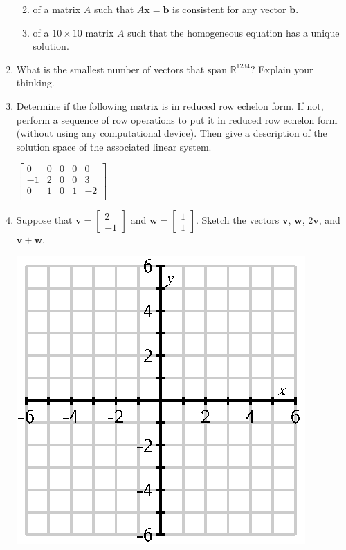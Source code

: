 \documentclass[12pt]{article}
\newcommand{\ds}{\displaystyle}
\newcommand{\vs}[1]{\vspace{#1in}}
\newcommand{\bvec}{{\mathbf b}}
\newcommand{\vvec}{{\mathbf v}}
\newcommand{\wvec}{{\mathbf w}}
\newcommand{\xvec}{{\mathbf x}}
\newcommand{\real}{{\mathbb R}}
\newcommand{\twovec}[2]{\left[\begin{array}{r}#1 \\ #2
    \end{array}\right]}
\begin{document}
\begin{enumerate}
\begin{enumerate}[label=(\alph*)]
    \vs{0.75}
  \item of a matrix $A$ such that $A\xvec=\bvec$ is
    consistent for any vector $\bvec$.

    \vs{0.75}
  \item of a $10\times10$ matrix $A$ such that the homogeneous
    equation has a unique solution.

    \vs{0.75}
  \end{enumerate}


\item What is the smallest number of vectors that span $\real^{1234}$?
  Explain your thinking.

  \vs{1}

  \newpage
\item Determine if the following matrix is in reduced row echelon
  form.  If not, perform a sequence of row operations to put it in
  reduced row echelon form (without using any computational device).
  Then give a description of the solution space of the associated
  linear system.

  $\ds
  \left[
    \begin{array}{cccc|c}
      0 & 0 & 0 & 0 & 0 \\
      -1 & 2 & 0 & 0 & 3 \\
      0 & 1 & 0 & 1 & -2 \\
    \end{array}
  \right]
  $

  \vs{1}
\item Suppose that $\vvec=\twovec2{-1}$ and $\wvec=\twovec11$.  Sketch
  the vectors $\vvec$, $\wvec$, $2\vvec$, and $\vvec+\wvec$.

  \begin{center}
    \includegraphics{empty-6.eps}
  \end{center}


\end{enumerate}
\end{document}

